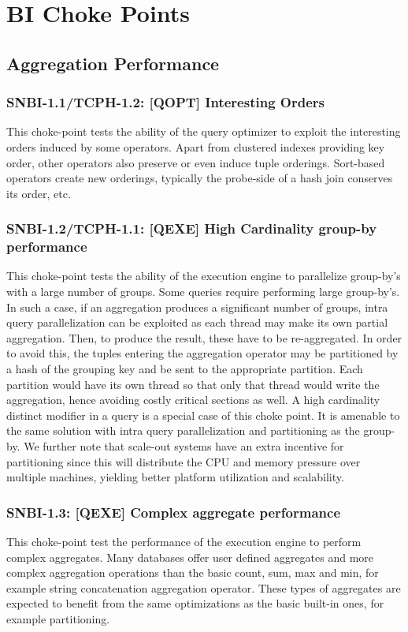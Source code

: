 \section{BI Choke Points}

\subsection{Aggregation Performance}

\subsubsection{SNBI-1.1/TCPH-1.2: [QOPT]  Interesting Orders}
\label{choke_point_1.1}
This choke-point tests the ability of the query optimizer to exploit the interesting orders induced by some operators. Apart from clustered indexes providing key order, other operators also preserve or even induce tuple orderings.
Sort-based operators create new orderings, typically the probe-side of a hash join conserves its order, etc.

\subsubsection{SNBI-1.2/TCPH-1.1: [QEXE] High Cardinality group-by performance}
\label{choke_point_1.2}
This choke-point tests the ability of the execution engine to parallelize group-by's with a large number of groups. Some queries require performing large group-by's.
In such a case, if an aggregation produces a significant number of groups, intra query parallelization can be exploited as each thread may make its own partial aggregation.
Then, to produce the result, these have to be re-aggregated. In order to avoid this, the tuples entering the aggregation operator may be partitioned by a hash of the grouping key and be sent to the appropriate partition.
Each partition would have its own thread so that only that thread would write the aggregation, hence avoiding costly critical sections as well. A high cardinality distinct modifier in a query is a special case of this choke point.
It is amenable to the same solution with intra query parallelization and partitioning as the group-by.
We further note that scale-out systems have an extra incentive for partitioning since this will distribute the CPU and memory pressure over multiple machines, yielding better platform utilization and scalability.

\subsubsection{SNBI-1.3: [QEXE] Complex aggregate performance}
\label{choke_point_1.3}
This choke-point test the performance of the execution engine to perform complex aggregates. Many databases offer user defined aggregates and more complex aggregation operations than the basic count, sum, max and min, for example string concatenation aggregation operator. These types of aggregates are expected to benefit from the same optimizations as the basic built-in ones, for example partitioning.

